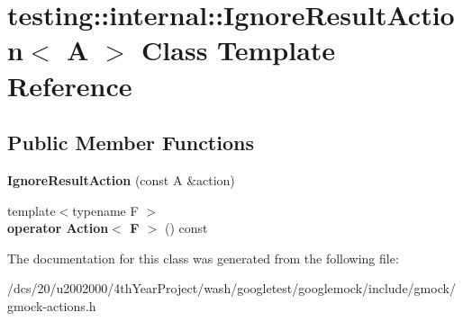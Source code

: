 \hypertarget{classtesting_1_1internal_1_1IgnoreResultAction}{}\section{testing\+:\+:internal\+:\+:Ignore\+Result\+Action$<$ A $>$ Class Template Reference}
\label{classtesting_1_1internal_1_1IgnoreResultAction}
\subsection*{Public Member Functions}
\begin{DoxyCompactItemize}
\item 
\mbox{\label{classtesting_1_1internal_1_1IgnoreResultAction_a9199f7b1b7771b2e2a5fd28caf624623}} 
{\bfseries Ignore\+Result\+Action} (const A \&action)
\item 
\mbox{\label{classtesting_1_1internal_1_1IgnoreResultAction_affb8b7439604c860e1416f45339c6e37}} 
{\footnotesize template$<$typename F $>$ }\\{\bfseries operator Action$<$ F $>$} () const
\end{DoxyCompactItemize}


The documentation for this class was generated from the following file\+:\begin{DoxyCompactItemize}
\item 
/dcs/20/u2002000/4th\+Year\+Project/wash/googletest/googlemock/include/gmock/gmock-\/actions.\+h\end{DoxyCompactItemize}
